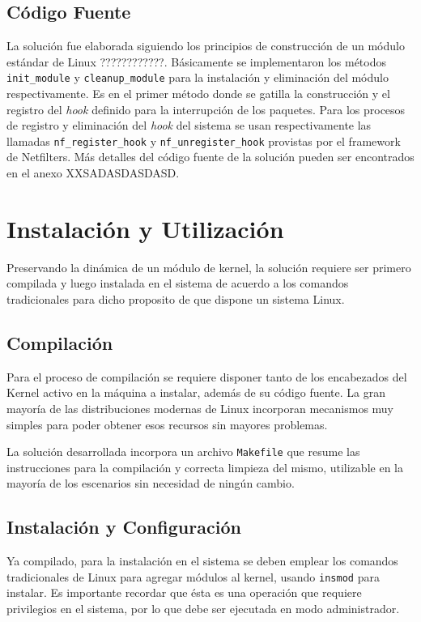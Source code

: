 \subsection{Código Fuente}
La solución fue elaborada siguiendo los principios de construcción de un módulo estándar de Linux ????????????. Básicamente se implementaron los métodos \verb=init_module= y \verb=cleanup_module= para la instalación y eliminación del módulo respectivamente. Es en el primer método donde se gatilla la construcción y el registro del \emph{hook} definido para la interrupción de los paquetes. Para los procesos de registro y eliminación del \emph{hook} del sistema se usan respectivamente las llamadas \verb=nf_register_hook= y \verb=nf_unregister_hook= provistas por el framework de Netfilters. Más detalles del código fuente de la solución pueden ser encontrados en el anexo XXSADASDASDASD.


\section{Instalación y Utilización}
Preservando la dinámica de un módulo de kernel, la solución requiere ser primero compilada y luego instalada en el sistema de acuerdo a los comandos tradicionales para dicho proposito de que dispone un sistema Linux.

\subsection{Compilación}
Para el proceso de compilación se requiere disponer tanto de los encabezados del Kernel activo en la máquina a instalar, además de su código fuente. La gran mayoría de las distribuciones modernas de Linux incorporan mecanismos muy simples para poder obtener esos recursos sin mayores problemas.

La solución desarrollada incorpora un archivo \verb=Makefile= que resume las instrucciones para la compilación y correcta limpieza del mismo, utilizable en la mayoría de los escenarios sin necesidad de ningún cambio.

\subsection{Instalación y Configuración}
Ya compilado, para la instalación en el sistema se deben emplear los comandos tradicionales de Linux para agregar módulos al kernel, usando \verb=insmod= para instalar. Es importante recordar que ésta es una operación que requiere privilegios en el sistema, por lo que debe ser ejecutada en modo administrador.

